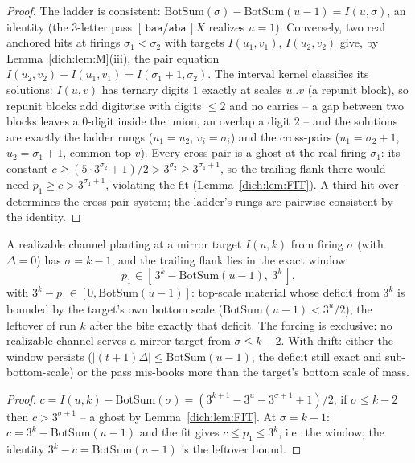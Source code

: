\documentclass[runningheads,envcountsect]{llncs}
\begin{document}
\begin{proof}
    The ladder is consistent: $\mathrm{BotSum}(\sigma) - \mathrm{BotSum}(u{-}1) = I(u, \sigma)$, an identity (the $3$-letter pass $[\,\mathtt{baa}/\mathtt{aba}\,]X$ realizes $u = 1$). Conversely, two real anchored hits at firings $\sigma_1 < \sigma_2$ with targets $I(u_1, v_1)$, $I(u_2, v_2)$ give, by Lemma~\ref{dich:lem:M}(iii), the pair equation $I(u_2, v_2) - I(u_1, v_1) = I(\sigma_1{+}1, \sigma_2)$. The interval kernel classifies its solutions: $I(u,v)$ has ternary digits $1$ exactly at scales $u..v$ (a repunit block), so repunit blocks add digitwise with digits $\le 2$ and no carries -- a gap between two blocks leaves a $0$-digit inside the union, an overlap a digit $2$ -- and the solutions are exactly the ladder rungs ($u_1 = u_2$, $v_i = \sigma_i$) and the cross-pairs ($u_1 = \sigma_2{+}1$, $u_2 = \sigma_1{+}1$, common top $v$). Every cross-pair is a ghost at the real firing $\sigma_1$: its constant $c \ge (5 \cdot 3^{\sigma_2} + 1)/2 > 3^{\sigma_2} \ge 3^{\sigma_1+1}$, so the trailing flank there would need $p_1 \ge c > 3^{\sigma_1+1}$, violating the fit (Lemma~\ref{dich:lem:FIT}). A third hit over-determines the cross-pair system; the ladder's rungs are pairwise consistent by the identity.
\end{proof}

\begin{lemma}
    \label{dich:lem:S}
    A realizable channel planting at a mirror target $I(u,k)$ from firing $\sigma$ (with $\Delta = 0$) has $\sigma = k{-}1$, and the trailing flank lies in the exact window
    \begin{equation*}
        p_1 \in [\,3^{k} - \mathrm{BotSum}(u{-}1),\ 3^{k}\,],
    \end{equation*}
    with $3^k - p_1 \in [0, \mathrm{BotSum}(u{-}1)]$: top-scale material whose deficit from $3^k$ is bounded by the target's own bottom scale ($\mathrm{BotSum}(u{-}1) < 3^{u}/2$), the leftover of run $k$ after the bite exactly that deficit. The forcing is exclusive: no realizable channel serves a mirror target from $\sigma \le k{-}2$. With drift: either the window persists ($|(t{+}1)\Delta| \le \mathrm{BotSum}(u{-}1)$, the deficit still exact and sub-bottom-scale) or the pass mis-books more than the target's bottom scale of mass.
\end{lemma}

\begin{proof}
    $c = I(u,k) - \mathrm{BotSum}(\sigma) = (3^{k+1} - 3^{u} - 3^{\sigma+1} + 1)/2$; if $\sigma \le k{-}2$ then $c > 3^{\sigma+1}$ -- a ghost by Lemma~\ref{dich:lem:FIT}. At $\sigma = k{-}1$: $c = 3^{k} - \mathrm{BotSum}(u{-}1)$ and the fit gives $c \le p_1 \le 3^{k}$, i.e.\ the window; the identity $3^{k} - c = \mathrm{BotSum}(u{-}1)$ is the leftover bound.
\end{proof}
\end{document}
